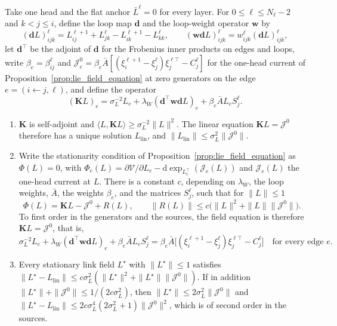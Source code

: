 \documentclass[twoside,11pt]{article}
\begin{document}
\begin{proposition}
\label{prop:app_linearized}
Take one head and the flat anchor $\bar L^\ell=0$ for every layer. For $0\le\ell\le N_\ell-2$ and $k<j\le i$, define the loop map $\mathbf d$ and the loop-weight operator $\mathbf w$ by
\begin{equation}
(\mathbf dL)_{ijk}^\ell=L_{ij}^{\ell+1}+L_{jk}^\ell-L_{ik}^{\ell+1}-L_{kk}^\ell,\qquad(\mathbf w\mathbf dL)_{ijk}^\ell=w_{ijk}^\ell(\mathbf dL)_{ijk}^\ell,
\label{eq:app_loop_map}
\end{equation}
let $\mathbf d^\top$ be the adjoint of $\mathbf d$ for the Frobenius inner products on edges and loops, write $\beta_e=\beta_{ij}^\ell$ and $\mathcal J_e^0=\beta_e\bar A[(\xi_i^{\ell+1}-\xi_j^\ell)\xi_j^{\ell\top}-C_j^\ell]$ for the one-head current of Proposition~\ref{prop:lie_field_equation} at zero generators on the edge $e=(i\leftarrow j,\ell)$, and define the operator
\begin{equation}
(\mathbf K L)_e=\sigma_L^{-2}L_e+\lambda_W(\mathbf d^\top\mathbf w\mathbf dL)_e+\beta_e\bar AL_eS_j^\ell.
\label{eq:app_linear_operator}
\end{equation}
\begin{enumerate}
\item $\mathbf K$ is self-adjoint and $\langle L,\mathbf K L\rangle\ge\sigma_L^{-2}\|L\|^2$. The linear equation $\mathbf K L=\mathcal J^0$ therefore has a unique solution $L_{\mathrm{lin}}$, and $\|L_{\mathrm{lin}}\|\le\sigma_L^2\|\mathcal J^0\|$.
\item Write the stationarity condition of Proposition~\ref{prop:lie_field_equation} as $\Phi(L)=0$, with $\Phi_e(L)=\partial \mathcal V/\partial L_e-\mathrm d\exp_{L_e^\top}(\mathcal J_e(L))$ and $\mathcal J_e(L)$ the one-head current at $L$. There is a constant $c$, depending on $\lambda_W$, the loop weights, $\bar A$, the weights $\beta_e$, and the matrices $S_j^\ell$, such that for $\|L\|\le1$
\begin{equation}
\Phi(L)=\mathbf K L-\mathcal J^0+R(L),\qquad\|R(L)\|\le c\bigl(\|L\|^2+\|L\|\|\mathcal J^0\|\bigr).
\label{eq:app_linear_remainder}
\end{equation}
To first order in the generators and the sources, the field equation is therefore $\mathbf K L=\mathcal J^0$, that is,
\begin{equation}
\sigma_L^{-2}L_e+\lambda_W(\mathbf d^\top\mathbf w\mathbf dL)_e+\beta_e\bar AL_eS_j^\ell=\beta_e\bar A\bigl[(\xi_i^{\ell+1}-\xi_j^\ell)\xi_j^{\ell\top}-C_j^\ell\bigr]\quad\text{for every edge }e.
\label{eq:app_linear_equation}
\end{equation}
\item Every stationary link field $L^\star$ with $\|L^\star\|\le1$ satisfies $\|L^\star-L_{\mathrm{lin}}\|\le c\sigma_L^2(\|L^\star\|^2+\|L^\star\|\|\mathcal J^0\|)$. If in addition $\|L^\star\|+\|\mathcal J^0\|\le1/(2c\sigma_L^2)$, then $\|L^\star\|\le2\sigma_L^2\|\mathcal J^0\|$ and $\|L^\star-L_{\mathrm{lin}}\|\le2c\sigma_L^4(2\sigma_L^2+1)\|\mathcal J^0\|^2$, which is of second order in the sources.
\end{enumerate}
\end{proposition}
\end{document}

